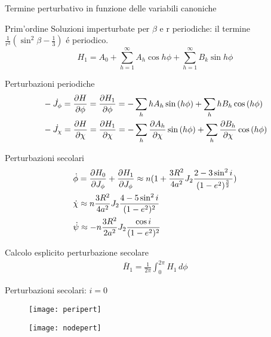 \begin{frame}{Termine perturbativo in funzione delle variabili canoniche}
\begin{block}{Prim'ordine}
Soluzioni imperturbate per $\beta$ e r periodiche: il termine $\frac{1}{r^3}(\sin^2{\beta}-\frac{1}{3})$ \'e periodico.
\begin{equation*}
H_1=A_0+\sum_{h=1}^{\infty}A_h\cos{h\phi}+\sum_{h=1}^{\infty}B_k\sin{h\phi}
\end{equation*}
\end{block}
\begin{block}{Perturbazioni periodiche}
\begin{align*}
&-\dot{J_{\phi}}=\PDy{\phi}{H}=\PDy{\phi}{H_1}=-\sum_hhA_h\sin{(h\phi)}+\sum_hhB_h\cos{(h\phi)}\\
&-\dot{J_{\chi}}=\PDy{\chi}{H}=\PDy{\chi}{H_1}=-\sum_h\PDy{\chi}{A_h}\sin{(h\phi)}+\sum_h\PDy{\chi}{B_h}\cos{(h\phi)}
\end{align*}
\end{block}
\end{frame}


\begin{frame}{Perturbazioni secolari}
\begin{align*}
&\dot{\phi}=\PDy{J_{\phi}}{H_0}+\PDy{J_{\phi}}{H_1}\approx n(1+\frac{3R^2}{4a^2}J_2\frac{2-3\sin^2{i}}{(1-e^2)\expy{\frac{3}{2}}})\\
&\dot{\chi}\approx n\frac{3R^2}{4a^2}J_2\frac{4-5\sin^2{i}}{(1-e^2)^2}\\
&\dot{\psi}\approx-n\frac{3R^2}{2a^2}J_2\frac{\cos{i}}{(1-e^2)^2}
\end{align*}
\end{frame}

\begin{wordonframe}{Calcolo esplicito perturbazione secolare}
\begin{align*}
\bar{H}_1=\frac{1}{2\pi}\int_0^{2\pi}H_1\,d\phi
\end{align*}
\end{wordonframe}

\begin{frame}{Perturbazioni secolari: $i=0$}
\begin{figure}[!ht]\texttt{[image: peripert]}\end{figure}
\begin{figure}[!ht]\texttt{[image: nodepert]}\end{figure}
\end{frame}

